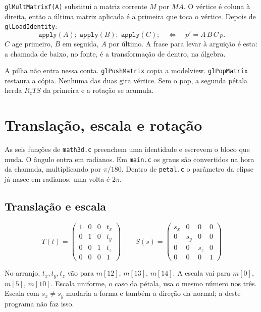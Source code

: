 \documentclass[11pt,a4paper]{article}
\newcommand{\fn}[1]{\texttt{\nobreak\hspace{0pt}#1}}
\begin{document}
\fn{glMultMatrixf(A)} substitui a matriz corrente \(M\) por \(M A\). O vértice é coluna à direita, então a última matriz aplicada é a primeira que toca o vértice. Depois de \fn{glLoadIdentity}:
\begin{equation}
  \texttt{apply}(A);\; \texttt{apply}(B);\; \texttt{apply}(C);
  \quad\Longleftrightarrow\quad
  p' = A\, B\, C\, p .
  \label{eq:ordem}
\end{equation}
\(C\) age primeiro, \(B\) em seguida, \(A\) por último. A frase para levar à arguição é esta: a chamada de baixo, no fonte, é a transformação de dentro, na álgebra.

A pilha não entra nessa conta. \fn{glPushMatrix} copia a modelview. \fn{glPopMatrix} restaura a cópia. Nenhuma das duas gira vértice. Sem o pop, a segunda pétala herda \(R_z T S\) da primeira e a rotação se acumula.

\section{Translação, escala e rotação}
\label{sec:afim}

As seis funções de \fn{math3d.c} preenchem uma identidade e escrevem o bloco que muda. O ângulo entra em radianos. Em \fn{main.c} os graus são convertidos na hora da chamada, multiplicando por \(\pi/180\). Dentro de \fn{petal.c} o parâmetro da elipse já nasce em radianos: uma volta é \(2\pi\).

\subsection{Translação e escala}

\[
T(t) =
\begin{pmatrix}
1 & 0 & 0 & t_x \\
0 & 1 & 0 & t_y \\
0 & 0 & 1 & t_z \\
0 & 0 & 0 & 1
\end{pmatrix}
\qquad
S(s) =
\begin{pmatrix}
s_x & 0 & 0 & 0 \\
0 & s_y & 0 & 0 \\
0 & 0 & s_z & 0 \\
0 & 0 & 0 & 1
\end{pmatrix}
\]

No arranjo, \(t_x, t_y, t_z\) vão para \(m[12]\), \(m[13]\), \(m[14]\). A escala vai para \(m[0]\), \(m[5]\), \(m[10]\). Escala uniforme, o caso da pétala, usa o mesmo número nos três. Escala com \(s_x \neq s_y\) mudaria a forma e também a direção da normal; a deste programa não faz isso.
\end{document}
